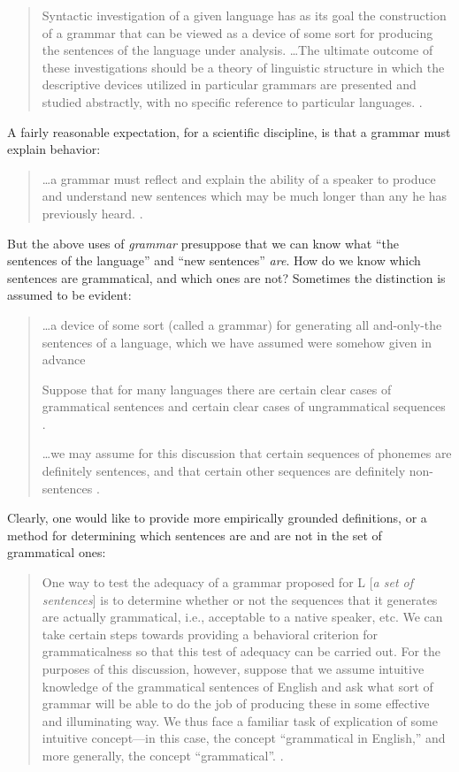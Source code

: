 \begin{quote}
Syntactic investigation of a given language has as its goal the construction of a grammar that can be viewed as a device of some sort for producing the sentences of the language under analysis. …The ultimate outcome of these investigations should be a theory of linguistic structure in which the descriptive devices utilized in particular grammars are presented and studied abstractly, with no specific reference to particular languages. \citep[11]{Chomsky1957}.
\end{quote}

A fairly reasonable expectation, for a scientific discipline, is that a grammar must explain behavior:

\begin{quote}
…a grammar must reflect and explain the ability of a speaker to produce and understand new sentences which may be much longer than any he has previously heard. \citep[124]{Chomsky1956}.
\end{quote}

  But the above uses of \textit{grammar} presuppose that we can know what “the sentences of the language” and “new sentences” \textit{are}. How do we know which sentences are grammatical, and which ones are not? Sometimes the distinction is assumed to be evident:

\begin{quote}
…a device of some sort (called a grammar) for generating all and-only-the sentences of a language, which we have assumed were somehow given in advance \citep[85]{Chomsky1957}

Suppose that for many languages there are certain clear cases of grammatical sentences and certain clear cases of ungrammatical sequences \citep[113]{Chomsky1956}.

…we may assume for this discussion that certain sequences of phonemes are definitely sentences, and that certain other sequences are definitely non-sentences \citep[14]{Chomsky1957}.
\end{quote}

Clearly, one would like to provide more empirically grounded definitions, or a method for determining which sentences are and are not in the set of grammatical ones:

\begin{quote}
One way to test the adequacy of a grammar proposed for L [\textit{a set of sentences}] is to determine whether or not the sequences that it generates are actually grammatical, i.e., acceptable to a native speaker, etc. We can take certain steps towards providing a behavioral criterion for grammaticalness so that this test of adequacy can be carried out. For the purposes of this discussion, however, suppose that we assume intuitive knowledge of the grammatical sentences of English and ask what sort of grammar will be able to do the job of producing these in some effective and illuminating way. We thus face a familiar task of explication of some intuitive concept—in this case, the concept “grammatical in English,” and more generally, the concept “grammatical”. \citep[13]{Chomsky1957}.
\end{quote}

